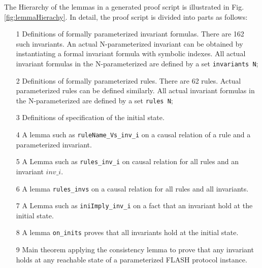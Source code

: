 \documentclass{llncs-new}
\begin{document}
The Hierarchy of the lemmas in a generated proof script is illustrated in Fig. \ref{fig:lemmaHierachy}. In detail, the proof script is divided into   parts as follows:
\begin{enumerate}
\item[1] Definitions of formally parameterized invariant formulas.%
    There are 162 such invariants. An actual N-parameterized invariant can be obtained by instantiating a formal invariant formula with symbolic indexes. All   actual invariant formulas in the N-parameterized are defined by a set {\tt invariants N};

\item[2] Definitions of formally parameterized rules. There are 62 rules. %
    Actual parameterized rules can be defined similarly. All actual invariant formulas in the N-parameterized are defined by a set {\tt rules N};

\item[3]  Definitions of specification of the initial state. %

\item[4] A lemma  such as {\tt ruleName\_Vs\_inv\_i} on a causal relation of a rule and a parameterized invariant. %


\item[5]  A  Lemma  such as {\tt rules\_inv\_i} on causal relation for  all rules and an invariant $inv\_i$.%


\item[6] A lemma {\tt rules\_invs} on a causal relation for all rules and all invariants. %

\item[7] A Lemma such as {\tt iniImply\_inv\_i} on a fact that an invariant  hold at the initial state. %

\item[8] A lemma {\tt on\_inits} proves that  all invariants hold at the initial state. %

\item[9] Main theorem  applying the consistency lemma to prove that any invariant   holds at any reachable state of  a parameterized FLASH protocol instance.
\end{enumerate}
\end{document}
